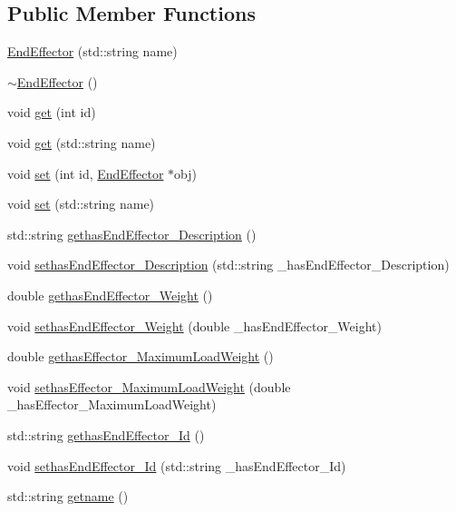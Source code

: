 \subsection*{Public Member Functions}
\begin{DoxyCompactItemize}
\item 
\hyperlink{class_end_effector_a97a5bb4d8630ff0ba0fc172b6dc01f15}{EndEffector} (std::string name)
\item 
\hyperlink{class_end_effector_a0ffb936e23ecc47b7b52088c558be7b9}{$\sim$EndEffector} ()
\item 
void \hyperlink{class_end_effector_a7edd1d305e1316dffda82a9d66a9564b}{get} (int id)
\item 
void \hyperlink{class_end_effector_ad46cf6320eb6ee331316a14b1095e8d8}{get} (std::string name)
\item 
void \hyperlink{class_end_effector_af6f2d56c3724fc82bcd6e8143fee05f2}{set} (int id, \hyperlink{class_end_effector}{EndEffector} $\ast$obj)
\item 
void \hyperlink{class_end_effector_a6361b8a7cb17a441de501387a1006993}{set} (std::string name)
\item 
std::string \hyperlink{class_end_effector_ae60df01deb3d460cec2832cd7617bddf}{gethasEndEffector\_\-Description} ()
\item 
void \hyperlink{class_end_effector_aa68b47f17d8444d0ce30cf573ab5f664}{sethasEndEffector\_\-Description} (std::string \_\-hasEndEffector\_\-Description)
\item 
double \hyperlink{class_end_effector_af494832528732f347cc1211aa7d5d677}{gethasEndEffector\_\-Weight} ()
\item 
void \hyperlink{class_end_effector_a3596de8e005b33c99d6d18e1c2e92d58}{sethasEndEffector\_\-Weight} (double \_\-hasEndEffector\_\-Weight)
\item 
double \hyperlink{class_end_effector_a158d0e1ecf0a0ef4c7f6686cedeee634}{gethasEffector\_\-MaximumLoadWeight} ()
\item 
void \hyperlink{class_end_effector_ac21ccbd72ce8bea4c1e8eed751958c4f}{sethasEffector\_\-MaximumLoadWeight} (double \_\-hasEffector\_\-MaximumLoadWeight)
\item 
std::string \hyperlink{class_end_effector_a154fcb6fee46342d7dc03b69359433d0}{gethasEndEffector\_\-Id} ()
\item 
void \hyperlink{class_end_effector_aa41a5c32cb0c03bd5f138b5e426c3834}{sethasEndEffector\_\-Id} (std::string \_\-hasEndEffector\_\-Id)
\item 
std::string \hyperlink{class_end_effector_a36e103bed34f4354487211af69eaea93}{getname} ()

\end{DoxyCompactItemize}
